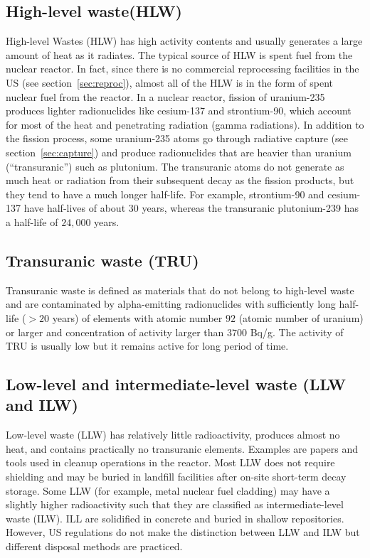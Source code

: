 \documentclass[nofootinbib,preprint,aps]{revtex4-1}
\begin{document}
    \subsection{High-level waste(HLW)}
    High-level Wastes (HLW) has high activity contents and usually generates a large amount of
    heat as it radiates. The typical source of HLW is spent fuel from the nuclear reactor.
    In fact, since there is no commercial reprocessing facilities in the US (see section~\ref{sec:reproc}),
    almost all of the HLW is in the form of spent nuclear fuel from the reactor. In a nuclear reactor,
    fission of uranium-235 produces lighter radionuclides like cesium-137 and strontium-90, which
    account for most of the heat and penetrating radiation (gamma radiations). In addition to
    the fission process, some uranium-235 atoms go through radiative capture
    (see section~\ref{sec:capture}) and produce radionuclides that are
    heavier than uranium (``transuranic'') such as plutonium. The transuranic atoms do not generate
    as much heat or radiation from their subsequent decay as the fission products, but they tend to have
    a much longer half-life.
    For example, strontium-90 and cesium-137 have half-lives of about $30$ years, whereas
    the transuranic plutonium-239 has a half-life of $24,000$ years.

    \subsection{Transuranic waste (TRU)}
    \label{sec:tru}
    Transuranic waste is defined as materials that do not belong to high-level waste and are
    contaminated by alpha-emitting radionuclides with
    sufficiently long half-life ($>20$ years) of elements with atomic number $92$ (atomic number of uranium)
    or larger and concentration of activity larger than $3700$ Bq/g.\cite{j83,s01} The activity
    of TRU is usually low but it remains active for long period of time.

    \subsection{Low-level and intermediate-level waste (LLW and ILW)}
    Low-level waste (LLW) has relatively little radioactivity, produces almost no heat,
    and contains practically no
    transuranic elements. Examples are papers and tools used in cleanup operations in the reactor.
    Most LLW does not require shielding and may be buried in landfill 
    facilities after on-site short-term decay storage.
    Some LLW (for example, metal nuclear fuel cladding) may have a slightly
    higher radioactivity such that they are classified
    as intermediate-level waste (ILW). ILL are solidified in concrete and buried in shallow
    repositories.\cite{s01} However, US regulations do not make the distinction
    between LLW and ILW but different disposal methods are practiced.\cite{nrc09, s01}
\end{document}
